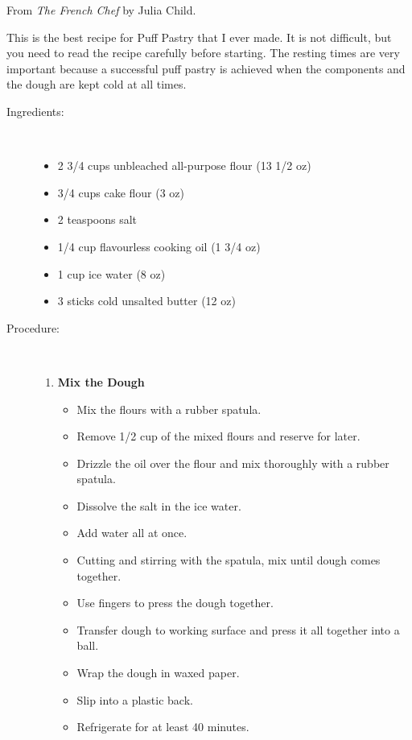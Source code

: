 \documentclass[11pt,letterpaper]{article}
\begin{document}


\begin{flushright}
From {\it  The French Chef} by Julia Child.
\end{flushright}
 
This is the best recipe for Puff Pastry that I ever made. It is not difficult, but you need to read the recipe carefully before starting. The resting times are very important because a successful puff pastry is achieved when the components and the dough are kept cold at all times.

\begin{description}

\item[Ingredients:]\ \\
	\begin{itemize}
	\item 2 3/4 cups unbleached all-purpose flour (13 1/2 oz)
	\item 3/4 cups cake flour (3 oz)
	\item 2 teaspoons salt 
	\item 1/4 cup flavourless cooking oil (1 3/4 oz)
	\item 1 cup ice water (8 oz)
	\item 3 sticks cold unsalted butter (12 oz)
	\end{itemize}

\item[Procedure:]\ \\
	\begin{enumerate}
	\item {\bf Mix the Dough}
	\begin{itemize}
	\item Mix the flours with a rubber spatula.
	\item Remove 1/2 cup of the mixed flours and reserve for later.
	\item Drizzle the oil over the flour and mix thoroughly with a rubber spatula.
	\item Dissolve the salt in the ice water.
	\item Add water all at once.
	\item Cutting and stirring with the spatula, mix until dough comes together.
	\item Use fingers to press the dough together.
	\item Transfer dough to working surface and press it all together into a ball.
	\item Wrap the dough in waxed paper.
	\item Slip into a plastic back.
	\item Refrigerate for at least 40 minutes.
	\end{itemize}
	

\end{enumerate}
\end{description}
\end{document}
